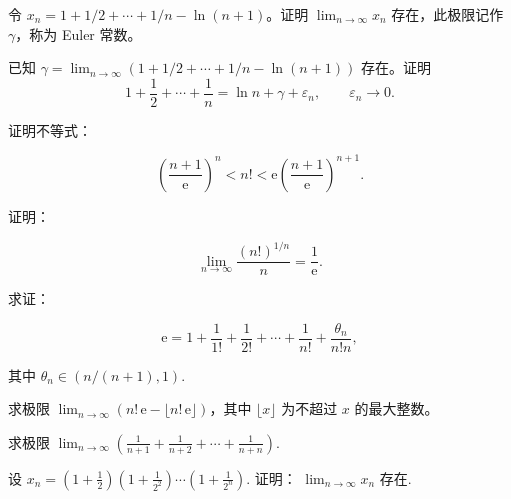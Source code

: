 \noindent\begin{minipage}{\textwidth}
令 $x_n=1+1/2+\cdots+1/n-\ln(n+1)$。证明 $\lim_{n\to\infty}x_n$ 存在，此极限记作 $\gamma$，称为 Euler 常数。
\end{minipage}\par\vfill
\noindent\begin{minipage}{\textwidth}
已知 $\gamma=\lim_{n\to\infty}(1+1/2+\cdots+1/n-\ln(n+1))$ 存在。证明\[1+\frac12+\cdots+\frac1n=\ln n+\gamma+\varepsilon_n,\qquad\varepsilon_n\to0.\]
\end{minipage}\par\vfill
\newpage
\noindent\begin{minipage}{\textwidth}
证明不等式：

\[\left(\frac{n+1}{\mathrm{e}}\right)^{n}<n!<\mathrm{e}\left(\frac{n+1}{\mathrm{e}}\right)^{n+1}.\]
\end{minipage}\par\vfill
\noindent\begin{minipage}{\textwidth}
证明：

\[\lim_{n\to\infty}\frac{(n!)^{1/n}}{n}=\frac{1}{\mathrm{e}}.\]
\end{minipage}\par\vfill
\noindent\begin{minipage}{\textwidth}
求证：

\[\mathrm{e}=1+\frac{1}{1!}+\frac{1}{2!}+\cdots+\frac{1}{n!}+\frac{\theta_{n}}{n!n},\]

其中  $ \theta_{n}\in(n/(n+1),1) $.
\end{minipage}\par\vfill
\newpage
\noindent\begin{minipage}{\textwidth}
求极限 $\lim_{n\to\infty}(n!\,\mathrm e-\lfloor n!\,\mathrm e\rfloor)$，其中 $\lfloor x\rfloor$ 为不超过 $x$ 的最大整数。
\end{minipage}\par\vfill
\noindent\begin{minipage}{\textwidth}
求极限  $ \lim_{n \to \infty} \left( \frac{1}{n+1} + \frac{1}{n+2} + \cdots + \frac{1}{n+n} \right) $.
\end{minipage}\par\vfill
\noindent\begin{minipage}{\textwidth}
设  $ x_{n}=\left(1+\frac{1}{2}\right)\left(1+\frac{1}{2^{2}}\right)\cdots\left(1+\frac{1}{2^{n}}\right) $. 证明： $ \lim_{n\to\infty}x_{n} $ 存在.
\end{minipage}\par\vfill
